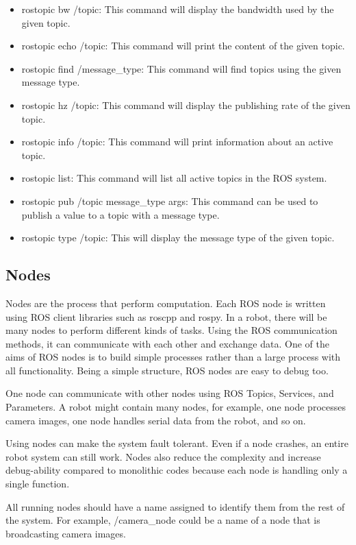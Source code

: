  	\begin{itemize}
 		\item rostopic bw /topic: This command will display the bandwidth used by the given topic.
 		\item rostopic echo /topic: This command will print the content of the given topic. 
 		\item rostopic find /message\_type: This command will find topics using the given message type. 
 		\item rostopic hz /topic: This command will display the publishing rate of the given topic. 
 		\item rostopic info /topic: This command will print information about an active topic. 
 		\item rostopic list: This command will list all active topics in the ROS system. 
 		\item rostopic pub /topic message\_type args: This command can be used to publish a value to a topic with a message type.
 		\item rostopic type /topic: This will display the message type of the given topic.
 	\end{itemize}
 
 	\subsection{Nodes}
 	Nodes are the process that perform computation. Each ROS node is written using ROS client libraries such as roscpp and rospy. In a robot, there will be many nodes to perform different kinds of tasks. Using the ROS communication methods, it can communicate with each other and exchange data. One of the aims of ROS nodes is to build simple processes rather than a large process with all functionality. Being a simple structure, ROS nodes are easy to debug too.
 	
 	One node can communicate with other nodes using ROS Topics, Services, and Parameters. A robot might contain many nodes, for example, one node processes camera images, one node handles serial data from the robot, and so on.
 	
 	Using nodes can make the system fault tolerant. Even if a node crashes, an entire robot system can still work. Nodes also reduce the complexity and increase debug-ability compared to monolithic codes because each node is handling only a single function.
 	
 	All running nodes should have a name assigned to identify them from the rest of the system. For example, /camera\_node could be a name of a node that is broadcasting camera
 	images.
 	

